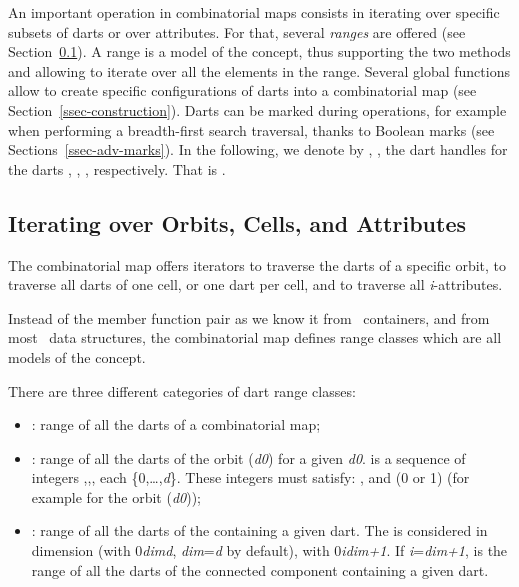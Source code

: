 An important operation in combinatorial maps consists in iterating
over specific subsets of darts or over attributes. For that, several
\emph{ranges} are offered (see Section~\ref{ssec-range}).  A range is
a model of the  concept, thus supporting the two methods
 and  allowing to iterate over all the
elements in the range.  Several global functions allow to create
specific configurations of darts into a combinatorial map (see
Section~\ref{ssec-construction}).  Darts can be marked during
operations, for example when performing a breadth-first search
traversal, thanks to Boolean marks (see
Sections~\ref{ssec-adv-marks}).  In the following, we denote by
, ,  the dart handles for the darts
, , , respectively. That is .

\subsection{Iterating over Orbits, Cells, and Attributes}\label{ssec-range}

The combinatorial map offers iterators to traverse the darts
of a specific orbit, to traverse all darts of one cell, or
one dart per cell, and to traverse all \emph{i}-attributes.

Instead of the  member function pair as we know it
from \stl\ containers, and from most \cgal\ data structures, the
combinatorial map defines range classes which are all models of the
 concept.

There are three different categories of dart range classes:
\begin{itemize}
\item {}: range of all the darts of a combinatorial map;
\item {}: range of all the darts of
  the orbit (\emph{d0}) for a given \emph{d0}.   is a
  sequence of integers 
  ,\myldots{},, 
  each \myin{}\{0,\ldots,\emph{d}\}. 
  These integers must satisfy:
  \mylt{}\mylt{}\myldots{}\mylt{},
  and (\myneq{}0 or \myneq{}1) 
  (for example  for the orbit
  \orbit{\betaun{},\betadeux{}}(\emph{d0}));	
\item {}: range of all the darts of
  the  containing a given dart. The  is considered in
  dimension  (with 0\myleq{}\emph{dim}\myleq{}\emph{d}, 
  \emph{dim}=\emph{d} by default), 
  with 0\myleq{}\emph{i}\myleq{}\emph{dim+1}. If \emph{i}=\emph{dim+1},
   is the range of all the darts of
  the connected component containing a given dart.
\end{itemize}

